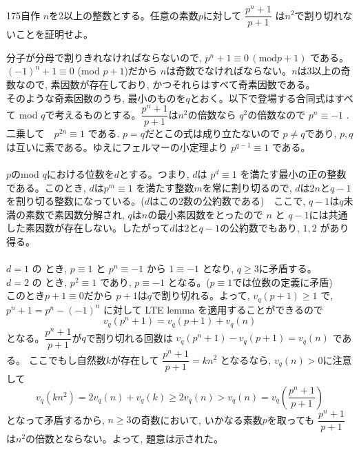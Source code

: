 \begin{prob}{175}{}{自作}
 $n$を2以上の整数とする。任意の素数$p$に対して $\dfrac{p^n+1}{p+1}$ は$n^2$で割り切れないことを証明せよ。
\end{prob}
分子が分母で割りきれなければならないので, $p^n+1\equiv 0 \, (\mbox{mod} p+1)$ である。$(-1)^n+1\equiv 0$ (mod  $p+1$)だから $n$は奇数でなければならない。$n$は3以上の奇数なので, 素因数が存在しており, かつそれらはすべて奇素因数である。\\
そのような奇素因数のうち, 最小のものを$q$とおく。以下で登場する合同式はすべて mod $q$で考えるものとする。$\dfrac{p^n+1}{p+1}$は$n^2$の倍数なら $q^2$の倍数なので $p^n\equiv -1$ . 二乗して　$p^{2n}\equiv 1$  である. $p=q$だとこの式は成り立たないので $p\neq q$であり, $p,q$は互いに素である。ゆえにフェルマーの小定理より $p^{q-1}\equiv 1$ である。\\
\\
$p$のmod $q$における位数を$d$とする。つまり, $d$は $p^d\equiv 1$ を満たす最小の正の整数である。このとき, $d$は$p^m\equiv 1$  を満たす整数$m$を常に割り切るので, $d$は$2n$と$q-1$ を割り切る整数になっている。($d$はこの2数の公約数である)　ここで, $q-1$は$q$未満の素数で素因数分解され, $q$は$n$の最小素因数をとったので $n$ と $q-1$には共通した素因数が存在しない。したがって$d$は$2$と$q-1$の公約数でもあり, $1,2$ があり得る。\\
\\
$d=1$ の とき, $p\equiv 1$ と $p^n\equiv -1$ から $1\equiv -1$ となり, $q\geq 3$に矛盾する。\\
$d=2$ の とき, $p^2\equiv 1$ であり,  $p\equiv -1$ となる。($p\equiv 1$では位数の定義に矛盾)\\
このとき$p+1\equiv 0$だから $p+1$は$q$で割り切れる。よって, $v_{q}(p+1)\geq 1$ で, $p^n+1=p^n-(-1)^n$ に対して LTE lemma を適用することができるので
\[v_q(p^n+1)=v_q(p+1)+v_q(n)\]
となる。$\dfrac{p^n+1}{p+1}$が$q$で割り切れる回数は $v_q{(p^n+1)}-v_q(p+1)=v_q(n)$ である。 ここでもし自然数$k$が存在して $\dfrac{p^n+1}{p+1}=kn^2$ となるなら, $v_q(n)>0$に注意して
\[v_q(kn^2)=2v_q(n)+v_q(k)\geq 2v_q(n)>v_q(n)=v_q\left(\dfrac{p^n+1}{p+1}\right)\]
となって矛盾するから, $n\geq 3$の奇数において, いかなる素数$p$を取っても $\dfrac{p^n+1}{p+1}$は$n^2$の倍数とならない。よって, 題意は示された。

